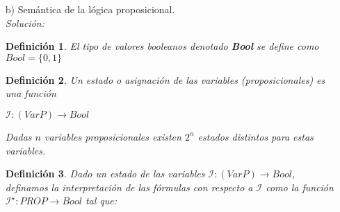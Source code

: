\documentclass[letterpaper,10pt]{article}
\begin{document}
\begin{enumerate}
\begin{itemize}
            \item[b)] Semántica de la lógica proposicional. \\ 
            \textit{Solución:}

            \newtheorem{teo}{Definición}[]
            \begin{teo} 
                El tipo de valores booleanos denotado \textbf{Bool} se define
                como $Bool = \{0, 1 \}$
            \end{teo}

            \begin{teo}
                Un estado o asignación de las variables (proposicionales) es 
                una función 

                \begin{center}
                    $\mathcal{I} : (Var P) \rightarrow Bool$
                \end{center}

                Dadas $n$ variables proposicionales existen $2^{n}$ estados
                distintos para estas variables.
            \end{teo}

            \begin{teo}
                Dado un estado de las variables 
                $\mathcal{I} : (Var P) \rightarrow Bool$, definamos la
                interpretación de las fórmulas con respecto a $\mathcal{I}$ 
                como la función $\mathcal{I^{\star}} : PROP \rightarrow Bool$
                tal que: 


\end{teo}
\end{itemize}
\end{enumerate}
\end{document}
